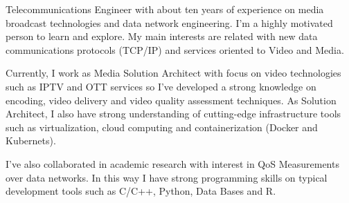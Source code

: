 \par{
Telecommunications Engineer with about ten years of experience on media broadcast technologies and data network engineering. I'm a highly motivated person to learn and explore. My main interests are related with new data communications protocols (TCP/IP) and services oriented to Video and Media.

Currently, I work as Media Solution Architect with focus on video technologies such as IPTV and OTT services so I've developed a strong knowledge on encoding, video delivery and video quality assessment techniques. As Solution Architect, I also have strong understanding of cutting-edge infrastructure tools such as virtualization, cloud computing and containerization (Docker and Kubernets).

I've also collaborated in academic research with interest in QoS Measurements over data networks. In this way I have strong programming skills on typical development tools such as C/C++, Python, Data Bases and R.
}